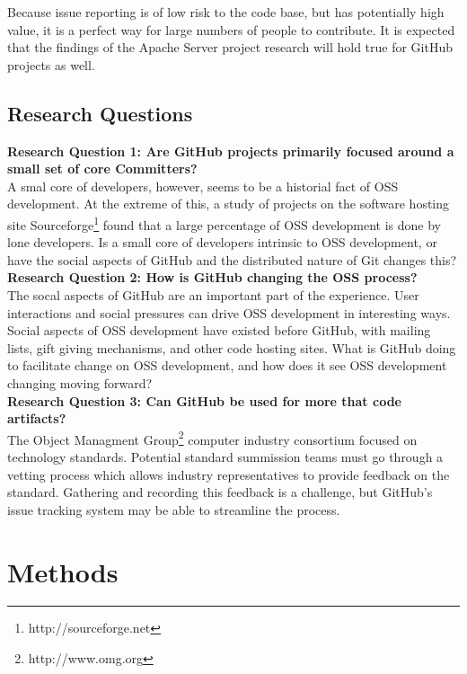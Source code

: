 \documentclass{proc}
\begin{document}
Because issue reporting is of low risk to the code base, but has potentially high value, it is a perfect way for large numbers of people to contribute. It is expected that the findings of the Apache Server project research will hold true for GitHub projects as well.\\

\subsection{Research Questions}

\textbf{Research Question 1: Are GitHub projects primarily focused around a small set of core Committers?}\\
A smal core of developers, however, seems to be a historial fact of OSS development\cite{mockus2000case,mockus2002two,krishnamurthy2002cave}. At the extreme of this, a study of projects on the software hosting site Sourceforge\footnote{http://sourceforge.net} found that a large percentage of OSS development is done by lone developers. Is a small core of developers intrinsic to OSS development, or have the social aspects of GitHub and the distributed nature of Git changes this?\\

\textbf{Research Question 2: How is GitHub changing the OSS process?}\\
The socal aspects of GitHub are an important part of the experience\cite{dabbish2012social}. User interactions and social pressures can drive OSS development in interesting ways. Social aspects of OSS development have existed before GitHub, with mailing lists\cite{mockus2000case}, gift giving mechanisms\cite{bergquist2008power}, and other code hosting sites. What is GitHub doing to facilitate change on OSS development, and how does it see OSS development changing moving forward?\\

\textbf{Research Question 3: Can GitHub be used for more that code artifacts?}\\
The Object Managment Group\textregistered\footnote{http://www.omg.org} computer industry consortium focused on technology standards. Potential standard summission teams must go through a vetting process\cite{kobryn1999uml} which allows industry representatives to provide feedback on the standard. Gathering and recording this feedback is a challenge, but GitHub's issue tracking system may be able to streamline the process.

\section{Methods}
\end{document}
